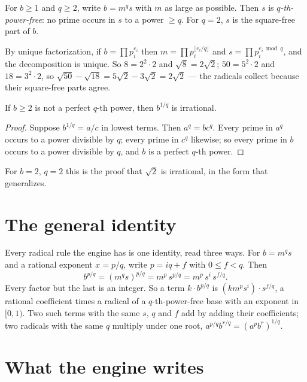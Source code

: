 \begin{definition}
  For $b \ge 1$ and $q \ge 2$, write $b = m^q s$ with $m$ as large as possible. Then $s$ is
  \emph{$q$-th-power-free}: no prime occurs in $s$ to a power $\ge q$. For $q = 2$, $s$ is the
  square-free part of $b$.
\end{definition}

By unique factorization, if $b = \prod p_i^{e_i}$ then $m = \prod p_i^{\lfloor e_i/q \rfloor}$
and $s = \prod p_i^{e_i \bmod q}$, and the decomposition is unique. So $8 = 2^2 \cdot 2$ and
$\sqrt 8 = 2\sqrt 2$; $50 = 5^2 \cdot 2$ and $18 = 3^2 \cdot 2$, so $\sqrt{50} - \sqrt{18} =
5\sqrt 2 - 3\sqrt 2 = 2\sqrt 2$ --- the radicals collect because their square-free parts agree.

\begin{theorem}[Irrationality]
  If $b \ge 2$ is not a perfect $q$-th power, then $b^{1/q}$ is irrational.
\end{theorem}
\begin{proof}
  Suppose $b^{1/q} = a/c$ in lowest terms. Then $a^q = b c^q$. Every prime in $a^q$ occurs to a
  power divisible by $q$; every prime in $c^q$ likewise; so every prime in $b$ occurs to a power
  divisible by $q$, and $b$ is a perfect $q$-th power.
\end{proof}

For $b = 2$, $q = 2$ this is the proof that $\sqrt 2$ is irrational, in the form that
generalizes.

\section{The general identity}

Every radical rule the engine has is one identity, read three ways. For $b = m^q s$ and a
rational exponent $x = p/q$, write $p = iq + f$ with $0 \le f < q$. Then
\[
  b^{p/q} = (m^q s)^{p/q} = m^p \, s^{p/q} = m^p\, s^{i}\, s^{f/q}.
\]
Every factor but the last is an integer. So a term $k \cdot b^{p/q}$ is $(k m^p s^i) \cdot s^{f/q}$,
a rational coefficient times a radical of a $q$-th-power-free base with an exponent in $[0, 1)$.
Two such terms with the same $s$, $q$ and $f$ add by adding their coefficients; two radicals with
the same $q$ multiply under one root, $a^{p/q} b^{r/q} = (a^p b^r)^{1/q}$.

\section{What the engine writes}

